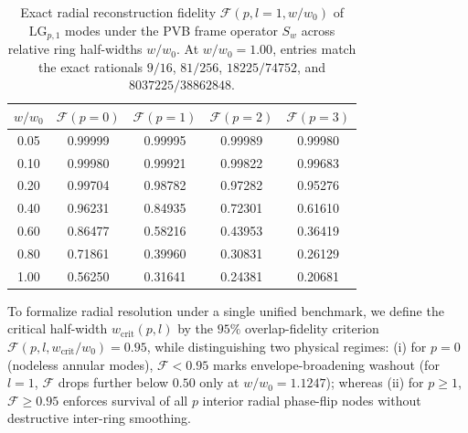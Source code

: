 \documentclass[aps,pra,reprint,nofootinbib,floatfix,longbibliography]{revtex4-2}
\theoremstyle{remark}
\begin{document}
\begin{table}[t]
\caption{Exact radial reconstruction fidelity $\mathcal{F}(p, l=1, w/w_0)$ of $\mathrm{LG}_{p,1}$ modes under the PVB frame operator $S_w$ across relative ring half-widths $w/w_0$. At $w/w_0 = 1.00$, entries match the exact rationals $9/16$, $81/256$, $18225/74752$, and $8037225/38862848$.}
\label{tab:fidelity}
\begin{ruledtabular}
\setlength{\tabcolsep}{3.5pt}
\begin{tabular}{ccccc}
$w / w_0$ & $\mathcal{F}(p=0)$ & $\mathcal{F}(p=1)$ & $\mathcal{F}(p=2)$ & $\mathcal{F}(p=3)$ \\
\hline
0.05 & 0.99999 & 0.99995 & 0.99989 & 0.99980 \\
0.10 & 0.99980 & 0.99921 & 0.99822 & 0.99683 \\
0.20 & 0.99704 & 0.98782 & 0.97282 & 0.95276 \\
0.40 & 0.96231 & 0.84935 & 0.72301 & 0.61610 \\
0.60 & 0.86477 & 0.58216 & 0.43953 & 0.36419 \\
0.80 & 0.71861 & 0.39960 & 0.30831 & 0.26129 \\
1.00 & 0.56250 & 0.31641 & 0.24381 & 0.20681 \\
\end{tabular}
\end{ruledtabular}
\end{table}

To formalize radial resolution under a single unified benchmark, we define the critical half-width $w_{\mathrm{crit}}(p,l)$ by the $95\%$ overlap-fidelity criterion $\mathcal{F}(p,l,w_{\mathrm{crit}}/w_0) = 0.95$, while distinguishing two physical regimes: (i) for $p = 0$ (nodeless annular modes), $\mathcal{F} < 0.95$ marks envelope-broadening washout (for $l = 1$, $\mathcal{F}$ drops further below $0.50$ only at $w/w_0 = 1.1247$); whereas (ii) for $p \ge 1$, $\mathcal{F} \ge 0.95$ enforces survival of all $p$ interior radial phase-flip nodes without destructive inter-ring smoothing.
\end{document}
